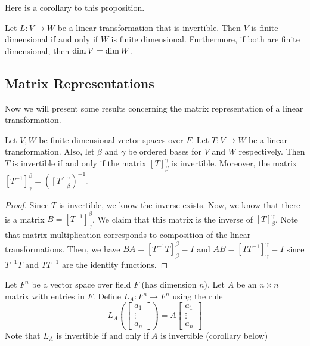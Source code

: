 \documentclass[main.tex]{subfiles}
\begin{document}
    Here is a corollary to this proposition. 
    \begin{cor}{}{}
        Let $L: V\to W$ be a linear transformation that is invertible. Then $V$ is finite dimensional if and only if $W$ is finite dimensional. Furthermore, if both are finite dimensional, then $\operatorname{dim} V = \operatorname{dim} W$.
    \end{cor}

    \subsection{Matrix Representations}
    Now we will present some results concerning the matrix representation of a linear transformation. 
    \begin{thrm}{}{}
        Let $V, W$ be finite dimensional vector spaces over $F$. Let $T: V\to W$ be a linear transformation. Also, let $\beta$ and $\gamma$ be ordered bases for $V$ and $W$ respectively. Then $T$ is invertible if and only if the matrix $[T]_\beta^\gamma$ is invertible. Moreover, the matrix $[T^{-1}]_\gamma^\beta = \left( [T]_\beta^\gamma \right)^{-1}$.
     \end{thrm}
     \begin{proof}
         Since $T$ is invertible, we know the inverse exists. Now, we know that there is a matrix $B = [T^{-1}]_\gamma^\beta$. We claim that this matrix is the inverse of $[T]_\beta^\gamma$. Note that matrix multiplication corresponds to composition of the linear transformations. Then, we have $BA = [T^{-1}T]_\beta^\beta = I$ and $AB = [TT^{-1}]_\gamma^\gamma = I$ since $T^{-1}T$ and $TT^{-1}$ are the identity functions.  
     \end{proof}

     \begin{example}{}{}
        Let $F^n$ be a vector space over field $F$ (has dimension $n$). Let $A$ be an $n\times n$ matrix with entries in $F$. Define $L_A : F^n \to F^n$ using the rule
        \begin{equation*}
            L_A\left( \begin{bmatrix} a_1 \\ \vdots \\ a_n \end{bmatrix} \right) = A\begin{bmatrix} a_1 \\ \vdots \\ a_n \end{bmatrix}
        \end{equation*}
        Note that $L_A$ is invertible if and only if $A$ is invertible (corollary below)
     \end{example}
\end{document}
